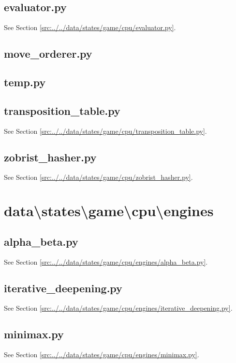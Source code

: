 \documentclass[../main/main.tex]{subfiles}
\begin{document}
\subsection{evaluator.py}
See Section \ref{src:../../data/states/game/cpu/evaluator.py}.

\subsection{move\_orderer.py}

\label{src:data/states/game/cpu/move_orderer.py}

\subsection{temp.py}

\label{src:data/states/game/cpu/temp.py}

\subsection{transposition\_table.py}
See Section \ref{src:../../data/states/game/cpu/transposition_table.py}.

\subsection{zobrist\_hasher.py}
See Section \ref{src:../../data/states/game/cpu/zobrist_hasher.py}.

\section{data\textbackslash states\textbackslash game\textbackslash cpu\textbackslash engines}
\subsection{alpha\_beta.py}
See Section \ref{src:../../data/states/game/cpu/engines/alpha_beta.py}.

\subsection{iterative\_deepening.py}
See Section \ref{src:../../data/states/game/cpu/engines/iterative_deepening.py}.

\subsection{minimax.py}
See Section \ref{src:../../data/states/game/cpu/engines/minimax.py}.
\end{document}
